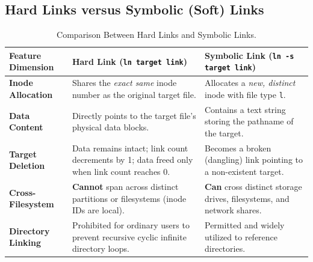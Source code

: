 \subsection{Hard Links versus Symbolic (Soft) Links}
\begin{table}[htbp]
\centering
\small
\begin{tabularx}{\linewidth}{l X X}
\toprule
\textbf{Feature Dimension} & \textbf{Hard Link (\texttt{ln target link})} & \textbf{Symbolic Link (\texttt{ln -s target link})} \\
\midrule
\textbf{Inode Allocation} & Shares the \textit{exact same} inode number as the original target file. & Allocates a \textit{new, distinct} inode with file type \texttt{l}. \\
\textbf{Data Content} & Directly points to the target file's physical data blocks. & Contains a text string storing the pathname of the target. \\
\textbf{Target Deletion} & Data remains intact; link count decrements by 1; data freed only when link count reaches 0. & Becomes a broken (dangling) link pointing to a non-existent target. \\
\textbf{Cross-Filesystem} & \textbf{Cannot} span across distinct partitions or filesystems (inode IDs are local). & \textbf{Can} cross distinct storage drives, filesystems, and network shares. \\
\textbf{Directory Linking} & Prohibited for ordinary users to prevent recursive cyclic infinite directory loops. & Permitted and widely utilized to reference directories. \\
\bottomrule
\end{tabularx}
\caption{Comparison Between Hard Links and Symbolic Links.}
\label{tab:links}
\end{table}

